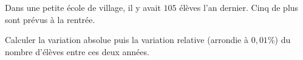 \begin{exo}{}
	Dans une petite école de village, il y avait $105$ élèves l'an dernier. Cinq de plus sont prévus à la rentrée.


	Calculer la variation absolue puis la variation relative (arrondie à $0,01$\%) du nombre d'élèves entre ces deux années.
\end{exo}
